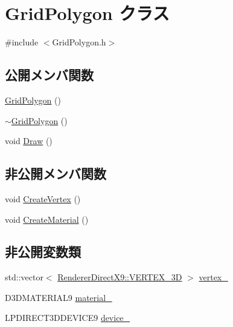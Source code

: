 \hypertarget{class_grid_polygon}{}\section{Grid\+Polygon クラス}
\label{class_grid_polygon}


{\ttfamily \#include $<$Grid\+Polygon.\+h$>$}

\subsection*{公開メンバ関数}
\begin{DoxyCompactItemize}
\item 
\mbox{\hyperlink{class_grid_polygon_a4fdbbc978d24c751b07c6803eb53075e}{Grid\+Polygon}} ()
\item 
\mbox{\hyperlink{class_grid_polygon_a25fbe0d5c2682a1174dda7d29f6ddf74}{$\sim$\+Grid\+Polygon}} ()
\item 
void \mbox{\hyperlink{class_grid_polygon_a93a672fb9d5b6757c132fba8792f5459}{Draw}} ()
\end{DoxyCompactItemize}
\subsection*{非公開メンバ関数}
\begin{DoxyCompactItemize}
\item 
void \mbox{\hyperlink{class_grid_polygon_a07b1e9c012d36086569860a30deb85d5}{Create\+Vertex}} ()
\item 
void \mbox{\hyperlink{class_grid_polygon_a6e9fc436896409cc4bfbf3a44d338d9b}{Create\+Material}} ()
\end{DoxyCompactItemize}
\subsection*{非公開変数類}
\begin{DoxyCompactItemize}
\item 
std\+::vector$<$ \mbox{\hyperlink{class_renderer_direct_x9_1_1_v_e_r_t_e_x__3_d}{Renderer\+Direct\+X9\+::\+V\+E\+R\+T\+E\+X\+\_\+3D}} $>$ \mbox{\hyperlink{class_grid_polygon_a71923f80b111b2868553f9f3600fa192}{vertex\+\_\+}}
\item 
D3\+D\+M\+A\+T\+E\+R\+I\+A\+L9 \mbox{\hyperlink{class_grid_polygon_a5aabcb6eed028eb7b093ce8f4e6936a8}{material\+\_\+}}
\item 
L\+P\+D\+I\+R\+E\+C\+T3\+D\+D\+E\+V\+I\+C\+E9 \mbox{\hyperlink{class_grid_polygon_a23d509ae7ad001e003897527380a8ca8}{device\+\_\+}}
\end{DoxyCompactItemize}


